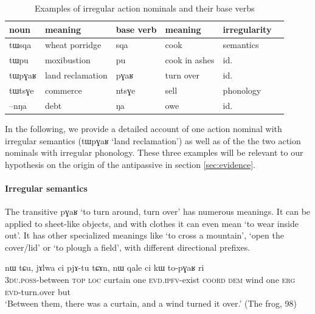 \documentclass[oldfontcommands,oneside,a4paper,11pt]{article}
\newcommand{\ipa}[1]{{\phon \mbox{#1}}} %
\begin{document}
\begin{table}[H]
\caption{Examples of irregular action nominals and their base verbs} \label{tab:irr.act.nmlz}
\begin{tabular}{llllll}
\toprule
 noun & meaning &base verb & meaning& irregularity\\
\midrule
\ipa{tɯsqa}   &wheat porridge& \ipa{sqa} & cook & semantics \\
\ipa{tɯpu}   &moxibustion& \ipa{pu} & cook in ashes &id.\\
\ipa{tɯpɣaʁ}   &land reclamation& \ipa{pɣaʁ} & turn over &id.\\
\midrule
\ipa{tɯtsɣe}&commerce & \ipa{ntsɣe} & sell & phonology\\
\ipa{--nŋa}   &debt& \ipa{ŋa} & owe &id.\\
\bottomrule
\end{tabular}
\end{table}

In the following, we provide a detailed account of one action nominal with irregular semantics (\ipa{tɯpɣaʁ}   `land reclamation') as well as of the the two action nominals with irregular phonology. These three examples will be relevant to our hypothesis on the origin of the antipassive in section \ref{sec:evidence}.

\paragraph{Irregular semantics}

The transitive  \ipa{pɣaʁ} `to turn around, turn over' has numerous meanings. It can be applied to sheet-like objects, and with clothes it can even mean `to wear inside out'. It has other specialized meanings like `to cross a mountain', `open the cover/lid' or `to plough a field', with different directional prefixes.
 
   \begin{exe} \label{ex:topGaR}
\ex
\gll  \ipa{ndʑi-pʰɤrtʰɤβ}    	\ipa{nɯ}    	\ipa{tɕu,}    	\ipa{jɤlwa}    	\ipa{ci}    	\ipa{pjɤ-tu}    	\ipa{tɕɤn,}    	\ipa{nɯ}    	\ipa{qale}    	\ipa{ci}    	\ipa{kɯ}    	\ipa{to-pɣaʁ}    \ipa{ri} \\
\textsc{3du.poss}-between \textsc{top} \textsc{loc} curtain one \textsc{evd.ipfv}-exist \textsc{coord} \textsc{dem} wind one \textsc{erg} \textsc{evd}-turn.over but \\
 \glt `Between them, there was a curtain, and a wind turned it over.' (The frog, 98)
\end{exe} 
\end{document}
